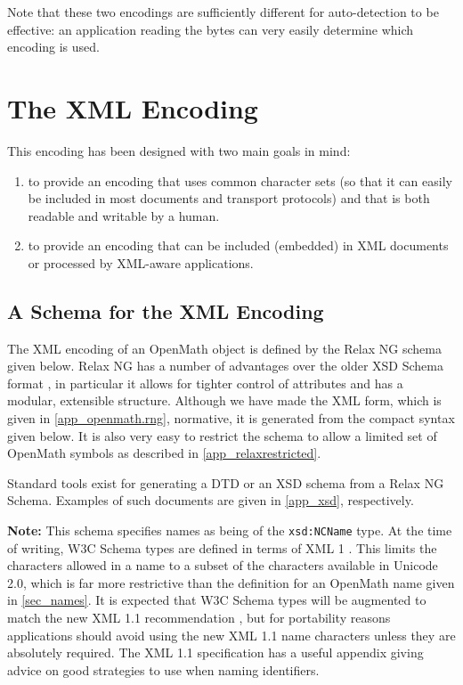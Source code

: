 \documentclass{report}
\def\OM{OpenMath\xspace}
\def\XML{XML\xspace}
\begin{document}
Note that these two encodings are sufficiently different for
auto-detection to be effective: an application reading the bytes can
very easily determine which encoding is used.


\section{The \XML Encoding}\label{sec_xml}

This encoding has been designed with two main goals in mind:
\begin{enumerate}
\item to provide an encoding that uses common character sets (so that it can easily be
  included in most documents and transport protocols) and that is both readable and
  writable by a human.
\item to provide an encoding that can be included (embedded) in \XML documents or
  processed by \XML-aware applications.
\end{enumerate}


\subsection{A Schema for the \XML Encoding}\label{ssec_xml}

The \XML encoding of an \OM object is defined by the Relax NG schema \cite{RELAX} given
below.  Relax NG has a number of advantages over the older XSD Schema format \cite{XSD},
in particular it allows for tighter control of attributes and has a modular, extensible
structure.  Although we have made the \XML form, which is given in \ref{app_openmath.rng},
normative, it is generated from the compact syntax given below.  It is also very easy to
restrict the schema to allow a limited set of \OM symbols as described in
\ref{app_relaxrestricted}.

Standard tools exist for generating a DTD or an XSD schema from a Relax NG Schema.
Examples of such documents are given in \ref{app_xsd}, respectively.



\textbf{Note:} This schema specifies names as being of the \lstinline|xsd:NCName| type. At
the time of writing, W3C Schema types are defined in terms of XML 1 \cite{xml_98}.  This
limits the characters allowed in a name to a subset of the characters available in Unicode
2.0, which is far more restrictive than the definition for an \OM name given in
\ref{sec_names}.  It is expected that W3C Schema types will be augmented to match the new
XML 1.1 recommendation \cite{xml_04}, but for portability reasons applications should
avoid using the new XML 1.1 name characters unless they are absolutely required.  The XML
1.1 specification has a useful appendix giving advice on good strategies to use when
naming identifiers.
\end{document}
